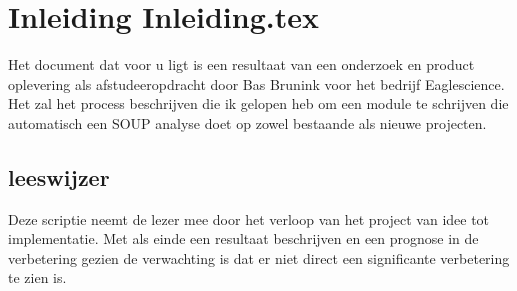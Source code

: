 \chapter{Inleiding Inleiding.tex} %

\label{ch:Inleiding} %
Het document dat voor u ligt is een resultaat van een onderzoek en product oplevering als afstudeeropdracht door Bas Brunink voor het bedrijf Eaglescience. Het zal het process beschrijven die ik gelopen heb om een module te schrijven die automatisch een SOUP analyse doet op zowel bestaande als nieuwe projecten. 

\section{leeswijzer}
Deze scriptie neemt de lezer mee door het verloop van het project van idee tot implementatie. Met als einde een resultaat beschrijven en een prognose in de verbetering gezien de verwachting is dat er niet direct een significante verbetering te zien is. 